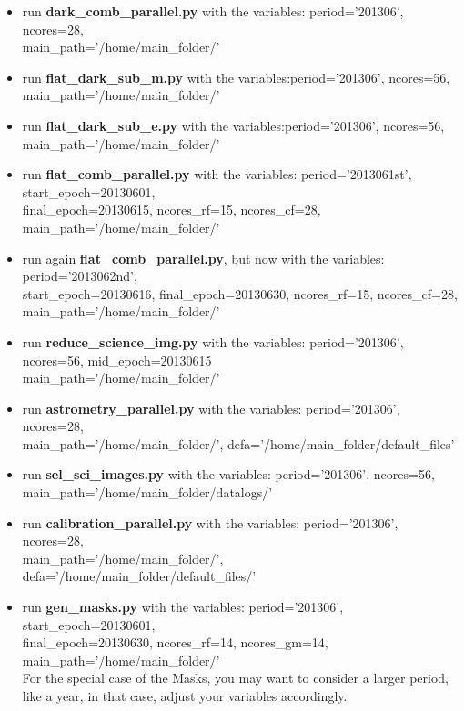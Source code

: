 \documentclass[letter, 12pt]{article}
\begin{document}
\begin{itemize}

\item run \textbf{dark\_comb\_parallel.py} with the variables: period='201306', ncores=28, 
\\main\_path='/home/main\_folder/'

\item run \textbf{flat\_dark\_sub\_m.py} with the variables:period='201306', ncores=56, 
\\main\_path='/home/main\_folder/'

\item run \textbf{flat\_dark\_sub\_e.py} with the variables:period='201306', ncores=56, 
\\main\_path='/home/main\_folder/'

\item run \textbf{flat\_comb\_parallel.py}  with the variables: period='2013061st', start\_epoch=20130601,
\\ final\_epoch=20130615, ncores\_rf=15, ncores\_cf=28, 
\\main\_path='/home/main\_folder/'

\item run again \textbf{flat\_comb\_parallel.py}, but now  with the variables: period='2013062nd', 
\\start\_epoch=20130616, final\_epoch=20130630, ncores\_rf=15, ncores\_cf=28, 
\\main\_path='/home/main\_folder/'

\item run \textbf{reduce\_science\_img.py}  with the variables: period='201306', ncores=56, mid\_epoch=20130615
\\main\_path='/home/main\_folder/'

\item run \textbf{astrometry\_parallel.py}  with the variables: period='201306', ncores=28,
\\main\_path='/home/main\_folder/', defa='/home/main\_folder/default\_files'

\item run  \textbf{sel\_sci\_images.py} with the variables: period='201306', ncores=56,
\\main\_path='/home/main\_folder/datalogs/'

\item run  \textbf{calibration\_parallel.py} with the variables: period='201306', ncores=28,
\\main\_path='/home/main\_folder/', defa='/home/main\_folder/default\_files/'


\item run \textbf{gen\_masks.py} with the variables: period='201306', start\_epoch=20130601,
\\ final\_epoch=20130630, ncores\_rf=14, ncores\_gm=14, 
\\main\_path='/home/main\_folder/'
\\For the special case of the Masks, you may want to consider a larger period, like a year, in that case, adjust your variables accordingly.

 



\end{itemize}
\end{document}
